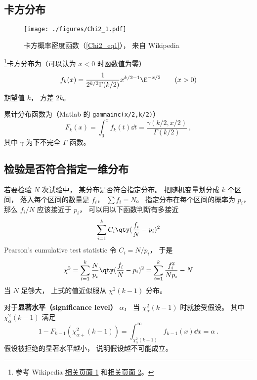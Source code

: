 
\begin{issues}
\issueDraft
\end{issues}

\subsection{卡方分布}
\begin{figure}[ht]
\centering
\texttt{[image: ./figures/Chi2\_1.pdf]}
\caption{卡方概率密度函数（\autoref{Chi2_eq1}）， 来自 Wikipedia} \label{Chi2_fig1}
\end{figure}

\footnote{参考 Wikipedia \href{https://en.wikipedia.org/wiki/Chi-squared_distribution}{相关页面 1} 和\href{https://en.wikipedia.org/wiki/Pearson's_chi-squared_test}{相关页面 2}。}卡方分布为（可以认为 $x<0$ 时函数值为零）
\begin{equation}\label{Chi2_eq1}
f_k(x) = \frac{1}{2^{k/2}\Gamma(k/2)}x^{k/2-1}\E^{-x/2} \qquad (x > 0)
\end{equation}
期望值 $k$， 方差 $2k$。

累计分布函数为（Matlab 的 \verb|gammainc(x/2,k/2)|）
\begin{equation}
F_k(x) = \int_0^{x} f_k(t) \dd{t} = \frac{\gamma(k/2, x/2)}{\Gamma(k/2)}~,
\end{equation}
其中 $\gamma$ 为下不完全 $\Gamma$ 函数。

\subsection{检验是否符合指定一维分布}
若要检验 $N$ 次试验中， 某分布是否符合指定分布。 把随机变量划分成 $k$ 个区间， 落入每个区间的数量是 $f_i$， $\sum f_i = N$。 指定分布在每个区间的概率为 $p_i$， 那么 $f_i/N$ 应该接近于 $p_i$， 可以用以下函数判断有多接近
\begin{equation}
\sum_{i=1}^k C_i \qty(\frac{f_i}{N} - p_i)^2
\end{equation}
Pearson's cumulative test statistic 令 $C_i = N/p_i$， 于是
\begin{equation}
\chi^2 = \sum_{i=1}^k \frac{N}{p_i} \qty(\frac{f_i}{N} - p_i)^2 = \sum_{i=1}^k \frac{f_i^2}{Np_i} - N
\end{equation}
当 $N$ 足够大， 上式的值近似服从 $\chi^2(k-1)$ 分布。

对于\textbf{显著水平（significance level）} $\alpha$， 当 $\chi_{\alpha}^2(k-1)$ 时就接受假设。 其中 $\chi_{\alpha}^2(k-1)$ 满足
\begin{equation}
1 - F_{k-1}(\chi_{\alpha+}^2(k-1)) = \int_{\chi_{\alpha}^2(k-1)}^\infty f_{k-1}(x) \dd{x} = \alpha~.
\end{equation}
假设被拒绝的显著水平越小， 说明假设越不可能成立。

